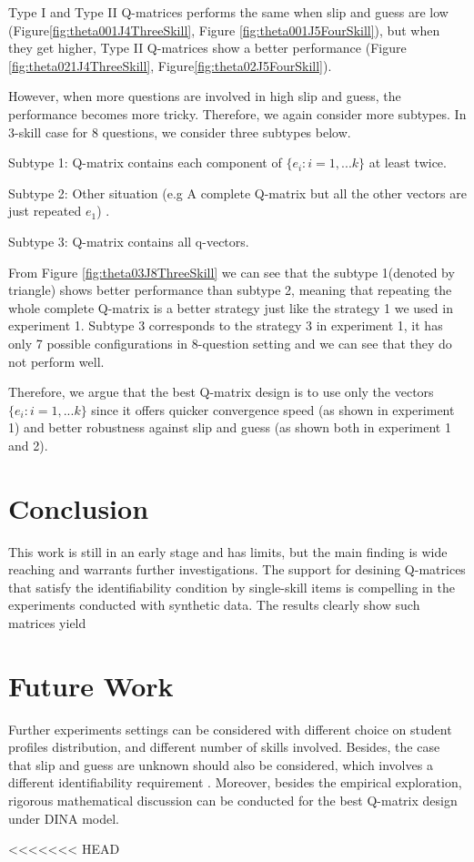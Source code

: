 \documentclass{edm_template}
\begin{document}
Type I and Type II Q-matrices performs the same when slip and guess are low (Figure\ref{fig:theta001J4ThreeSkill}, Figure \ref{fig:theta001J5FourSkill}), but when they get higher, Type II Q-matrices show a better performance (Figure \ref{fig:theta021J4ThreeSkill}, Figure\ref{fig:theta02J5FourSkill}).

However, when more questions are involved in high slip and guess, the performance becomes more tricky. Therefore, we again consider more subtypes. In 3-skill case for 8 questions, we consider three subtypes below. 

Subtype 1: Q-matrix contains each component of $\{e_{i}:i=1,...k\}$ at least twice. 

Subtype 2: Other situation (e.g A complete Q-matrix but all the other vectors are just repeated $e_1$)
.

Subtype 3: Q-matrix contains all q-vectors.

From Figure \ref{fig:theta03J8ThreeSkill} we can see that the subtype 1(denoted by triangle) shows better performance than subtype 2, meaning that repeating the whole complete Q-matrix is a better strategy just like the strategy 1 we used in experiment 1. Subtype 3 corresponds to the strategy 3 in experiment 1, it has only 7 possible configurations in 8-question setting and we can see that they do not perform well.

Therefore, we argue that the best Q-matrix design is to use only the vectors $\{e_{i}:i=1,...k\}$ since it offers quicker convergence speed (as shown in experiment 1) and better robustness against slip and guess (as shown both in experiment 1 and 2).

\section{Conclusion}

This work is still in an early stage and has limits, but the main finding is wide reaching and warrants further investigations.  The support for desining Q-matrices that satisfy the identifiability condition by single-skill items is compelling in the experiments conducted with synthetic data.  The results clearly show such matrices yield 

\section{Future Work}
Further experiments settings can be considered with different choice on student profiles distribution, and different number of skills involved. Besides, the case that slip and guess are unknown should also be considered, which involves a different identifiability requirement \cite{xu2015identifiability}. Moreover, besides the empirical exploration, rigorous mathematical discussion can be conducted for the best Q-matrix design under DINA model. 


<<<<<<< HEAD
\end{document}
